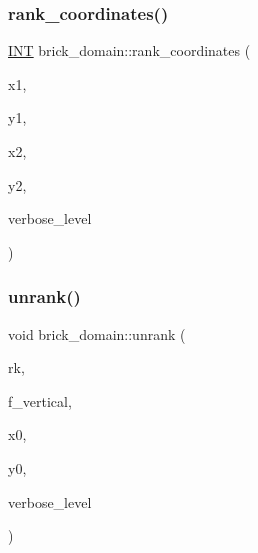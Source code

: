 \subsubsection{\texorpdfstring{rank\+\_\+coordinates()}{rank\_coordinates()}}
{\footnotesize\ttfamily \mbox{\hyperlink{galois_8h_a09fddde158a3a20bd2dcadb609de11dc}{I\+NT}} brick\+\_\+domain\+::rank\+\_\+coordinates (\begin{DoxyParamCaption}\item[{\mbox{\hyperlink{galois_8h_a09fddde158a3a20bd2dcadb609de11dc}{I\+NT}}}]{x1,  }\item[{\mbox{\hyperlink{galois_8h_a09fddde158a3a20bd2dcadb609de11dc}{I\+NT}}}]{y1,  }\item[{\mbox{\hyperlink{galois_8h_a09fddde158a3a20bd2dcadb609de11dc}{I\+NT}}}]{x2,  }\item[{\mbox{\hyperlink{galois_8h_a09fddde158a3a20bd2dcadb609de11dc}{I\+NT}}}]{y2,  }\item[{\mbox{\hyperlink{galois_8h_a09fddde158a3a20bd2dcadb609de11dc}{I\+NT}}}]{verbose\+\_\+level }\end{DoxyParamCaption})}

\mbox{\label{classbrick__domain_ae77f9055d5c6100c195867679603a3c2}} 
\subsubsection{\texorpdfstring{unrank()}{unrank()}}
{\footnotesize\ttfamily void brick\+\_\+domain\+::unrank (\begin{DoxyParamCaption}\item[{\mbox{\hyperlink{galois_8h_a09fddde158a3a20bd2dcadb609de11dc}{I\+NT}}}]{rk,  }\item[{\mbox{\hyperlink{galois_8h_a09fddde158a3a20bd2dcadb609de11dc}{I\+NT}} \&}]{f\+\_\+vertical,  }\item[{\mbox{\hyperlink{galois_8h_a09fddde158a3a20bd2dcadb609de11dc}{I\+NT}} \&}]{x0,  }\item[{\mbox{\hyperlink{galois_8h_a09fddde158a3a20bd2dcadb609de11dc}{I\+NT}} \&}]{y0,  }\item[{\mbox{\hyperlink{galois_8h_a09fddde158a3a20bd2dcadb609de11dc}{I\+NT}}}]{verbose\+\_\+level }\end{DoxyParamCaption})}

\mbox{\label{classbrick__domain_a2a4035be65c27fa4eaafae8db1fdf314}} 

